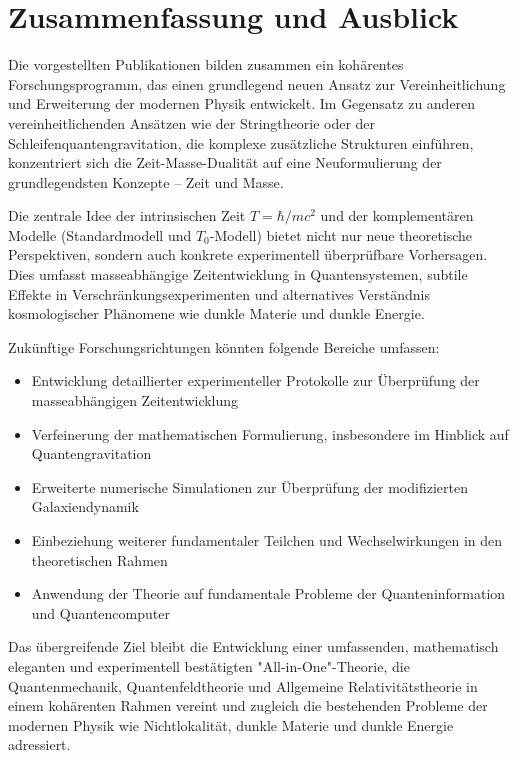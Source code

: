 \documentclass[a4paper,12pt]{article}
\begin{document}
	\section{Zusammenfassung und Ausblick}
	
	Die vorgestellten Publikationen bilden zusammen ein kohärentes Forschungsprogramm, das einen grundlegend neuen Ansatz zur Vereinheitlichung und Erweiterung der modernen Physik entwickelt. Im Gegensatz zu anderen vereinheitlichenden Ansätzen wie der Stringtheorie oder der Schleifenquantengravitation, die komplexe zusätzliche Strukturen einführen, konzentriert sich die Zeit-Masse-Dualität auf eine Neuformulierung der grundlegendsten Konzepte – Zeit und Masse.
	
	Die zentrale Idee der intrinsischen Zeit $T = \hbar/mc^2$ und der komplementären Modelle (Standardmodell und $T_0$-Modell) bietet nicht nur neue theoretische Perspektiven, sondern auch konkrete experimentell überprüfbare Vorhersagen. Dies umfasst masseabhängige Zeitentwicklung in Quantensystemen, subtile Effekte in Verschränkungsexperimenten und alternatives Verständnis kosmologischer Phänomene wie dunkle Materie und dunkle Energie.
	
	Zukünftige Forschungsrichtungen könnten folgende Bereiche umfassen:
	\begin{itemize}
		\item Entwicklung detaillierter experimenteller Protokolle zur Überprüfung der masseabhängigen Zeitentwicklung
		\item Verfeinerung der mathematischen Formulierung, insbesondere im Hinblick auf Quantengravitation
		\item Erweiterte numerische Simulationen zur Überprüfung der modifizierten Galaxiendynamik
		\item Einbeziehung weiterer fundamentaler Teilchen und Wechselwirkungen in den theoretischen Rahmen
		\item Anwendung der Theorie auf fundamentale Probleme der Quanteninformation und Quantencomputer
	\end{itemize}
	
	Das übergreifende Ziel bleibt die Entwicklung einer umfassenden, mathematisch eleganten und experimentell bestätigten "All-in-One"-Theorie, die Quantenmechanik, Quantenfeldtheorie und Allgemeine Relativitätstheorie in einem kohärenten Rahmen vereint und zugleich die bestehenden Probleme der modernen Physik wie Nichtlokalität, dunkle Materie und dunkle Energie adressiert.
	
\end{document}
